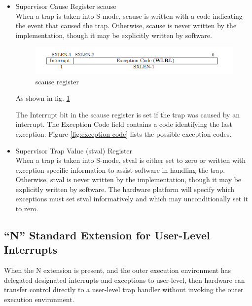 \documentclass[../main.tex]{subfiles}
\begin{document}
\begin{itemize}
    \item Supervisor Cause Register scause \\
        When a trap is taken into S-mode, scause is written with a code indicating the event that caused the trap. Otherwise, scause is never written by the implementation, though it may be explicitly written by software.\\
        
        \begin{figure}[h]
            \centering
            \includegraphics[width=10 cm]{diagrams/scause.png}
            \caption{scause register}
            \label{fig:scause}
        \end{figure}As shown in fig. \ref{fig:scause}
        
        The Interrupt bit in the scause register is set if the trap was caused by an interrupt. The Exception Code field contains a code identifying the last exception. Figure \ref{fig:exception-code} lists the possible exception codes.\\
          
    \item Supervisor Trap Value (stval) Register \\
        When a trap is taken into S-mode, stval is either set to zero or written with exception-specific information to assist software in handling the trap. Otherwise, stval is never written by the implementation, though it may be explicitly written by software. The hardware platform will specify which exceptions must set stval informatively and which may unconditionally set it to zero.
\end{itemize}


\subsection{“N” Standard Extension for User-Level Interrupts}
When the N extension is present, and the outer execution environment has delegated designated
interrupts and exceptions to user-level, then hardware can transfer control directly to a user-level
trap handler without invoking the outer execution environment.
\end{document}
